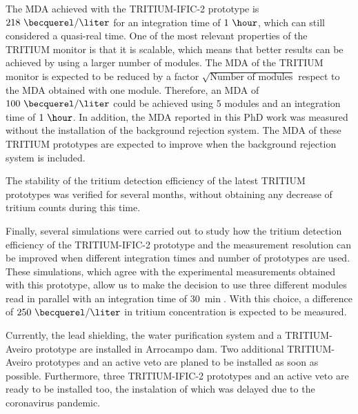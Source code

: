 The MDA achieved with the TRITIUM-IFIC-2 prototype is $218~\becquerel/\liter$ for an integration time of $1~\hour$, which can still considered a quasi-real time. One of the most relevant properties of the TRITIUM monitor is that it is scalable, which means that better results can be achieved by using a larger number of modules. The MDA of the TRITIUM monitor is expected to be reduced by a factor $\sqrt{\text{Number of modules}}$ respect to the MDA obtained with one module. Therefore, an MDA of  $100~\becquerel/\liter$ could be achieved using 5 modules and an integration time of $1~\hour$. In addition, the MDA reported in this PhD work was measured without the installation of the background rejection system. The MDA of these TRITIUM prototypes are expected to improve when the background rejection system is included.

The stability of the tritium detection efficiency of the latest TRITIUM prototypes was verified for several months, without obtaining any decrease of tritium counts during this time.

Finally, several simulations were carried out to study how the tritium detection efficiency of the TRITIUM-IFIC-2 prototype and the measurement resolution can be improved when different integration times and number of prototypes are used. These simulations, which agree with the experimental measurements obtained with this prototype, allow us to make the decision to use three different modules read in parallel with an integration time of $30~\min$. With this choice, a difference of $250~\becquerel/\liter$ in tritium concentration is expected to be measured.

Currently, the lead shielding, the water purification system and a TRITIUM-Aveiro prototype are installed in Arrocampo dam. Two additional TRITIUM-Aveiro prototypes and an active veto are planed to be installed as soon as possible. Furthermore, three TRITIUM-IFIC-2 prototypes and an active veto are ready to be installed too, the instalation of which was delayed due to the coronavirus pandemic.
